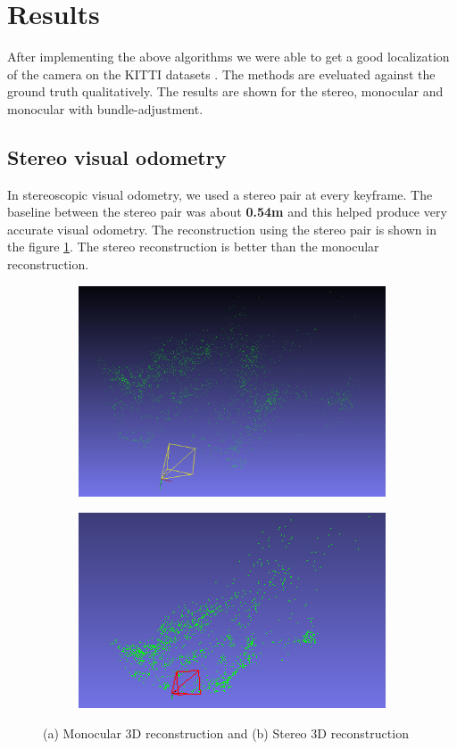 \documentclass{article}
\begin{document}
\section{Results}
After implementing the above algorithms we were able to get a good localization of the camera on the KITTI datasets \citep{kitti}. The methods are eveluated against the ground truth qualitatively. The results are shown for the stereo, monocular and monocular with bundle-adjustment.

\subsection{Stereo visual odometry}
In stereoscopic visual odometry, we used a stereo pair at every keyframe. The baseline between the stereo pair was about \textbf{0.54m} and this helped produce very accurate visual odometry. The reconstruction using the stereo pair is shown in the figure \ref{fig:reconstruction}. The stereo reconstruction is better than the monocular reconstruction.

\begin{figure}
\begin{subfigure}{0.5\textwidth}
\centering
\includegraphics[height=0.5\textwidth]{./mono_reconstruction}
\end{subfigure}
\begin{subfigure}{0.5\textwidth}
\centering
\includegraphics[height=0.5\textwidth]{./stereo_reconstruction}
\end{subfigure}
\caption{(a) Monocular 3D reconstruction and (b) Stereo 3D reconstruction}
\label{fig:reconstruction}
\end{figure}
\end{document}
